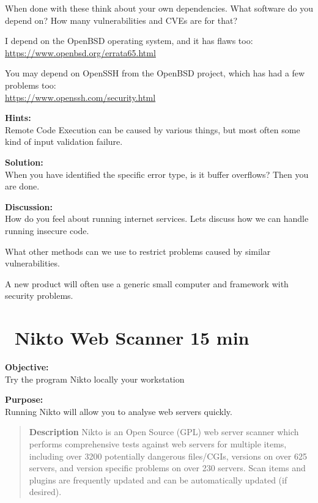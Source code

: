 \documentclass[a4paper,11pt,notitlepage]{report}
\begin{document}
When done with these think about your own dependencies. What software do you depend on? How many vulnerabilities and CVEs are for that?

I depend on the OpenBSD operating system, and it has flaws too:\\
\url{https://www.openbsd.org/errata65.html}

You may depend on OpenSSH from the OpenBSD project, which has had a few problems too:\\
\url{https://www.openssh.com/security.html}

{\bf Hints:}\\
Remote Code Execution can be caused by various things, but most often some kind of input validation failure.

{\bf Solution:}\\
When you have identified the specific error type, is it buffer overflows? Then you are done.

{\bf Discussion:}\\
How do you feel about running internet services. Lets discuss how we can handle running insecure code.

What other methods can we use to restrict problems caused by similar vulnerabilities.

A new product will often use a generic small computer and framework with security problems.



\chapter{\faInfoCircle\ Nikto Web Scanner 15 min}
\label{ex:nikto-webscanner}

{\bf Objective:}\\
Try the program Nikto locally your workstation


{\bf Purpose:}\\
Running Nikto will allow you to analyse web servers quickly.


\begin{quote}
{\bf Description}
Nikto is an Open Source (GPL) web server scanner which performs
comprehensive tests against web servers for multiple items, including
over 3200 potentially dangerous files/CGIs, versions on over 625
servers, and version specific problems on over 230 servers. Scan items
and plugins are frequently updated and can be automatically updated
(if desired).
\end{quote}
\end{document}
